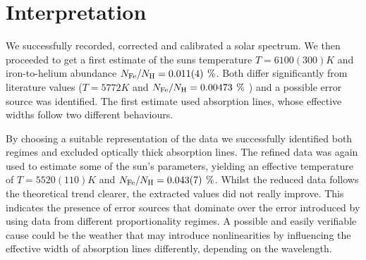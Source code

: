 \section{Interpretation}
We successfully recorded, corrected and calibrated a solar spectrum. We then proceeded to get a first estimate of the suns temperature $T = 6100(300) \unit{K}$ and iron-to-helium abundance $\NFe/\NH = 0.011(4) \unit{\percent}$. Both differ significantly from literature values ($T = 5772 \unit{K}$ and $\NFe/\NH = 0.00473 \unit{\percent}$ \autocite{NASA}) and a possible error source was identified. The first estimate used absorption lines, whose effective widths follow two different behaviours. 

By choosing a suitable representation of the data we successfully identified both regimes and excluded optically thick absorption lines. The refined data was again used to estimate some of the sun's parameters, yielding an effective temperature of $T = 5520(110) \unit{K}$ and $\NFe/\NH = 0.043(7) \unit{\percent}$. Whilst the reduced data follows the theoretical trend clearer, the extracted values did not really improve. This indicates the presence of error sources that dominate over the error introduced by using data from different proportionality regimes. A possible and easily verifiable cause could be the weather that may introduce nonlinearities by influencing the effective width of absorption lines differently, depending on the wavelength.

